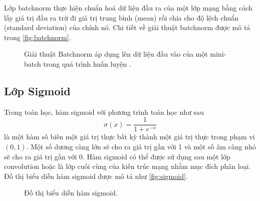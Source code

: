 	Lớp batchnorm thực hiện chuẩn hoá dữ liệu đầu ra của một lớp mạng bằng cách lấy giá trị đầu ra trừ đi giá trị trung bình (mean) rồi chia cho độ lệch chuẩn (standard deviation) của chính nó. Chi tiết về giải thuật batchnorm được mô tả trong \autoref{fig:batchnorm}.
	\begin{figure}[h!]
		\centering
		\caption[Giải thuật Batchnorm áp dụng lên dữ liệu đầu vào của một mini-batch.]{Giải thuật Batchnorm áp dụng lên dữ liệu đầu vào của một mini-batch trong quá trình huấn luyện .}
		\label{fig:batchnorm}
	\end{figure}

\newpage
\subsection{Lớp Sigmoid}
\label{subsec:lop_sigmoid}
	Trong toán học, hàm sigmoid với phương trình toán học như sau
	\begin{equation}
	\sigma(x)=\dfrac{1}{1+e^{-x}}
	\label{eqn:sigmoid}
	\end{equation}
	là một hàm số biến một giá trị thực bất kỳ thành một giá trị thực trong phạm vi $(0, 1)$. Một số dương càng lớn sẽ cho ra giá trị gần với 1 và một số âm càng nhỏ sẽ cho ra giá trị gần với 0. Hàm sigmoid có thể được sử dụng sau một lớp convolution hoặc là lớp cuối cùng của kiến trúc mạng nhằm mục đích phân loại. Đồ thị biểu diễn hàm sigmoid được mô tả như \autoref{fig:sigmoid}.
	\begin{figure}[h!]
		\centering
		
		\caption{Đồ thị biểu diễn hàm sigmoid.}
		\label{fig:sigmoid}
	\end{figure}
	\vspace{-6mm}

